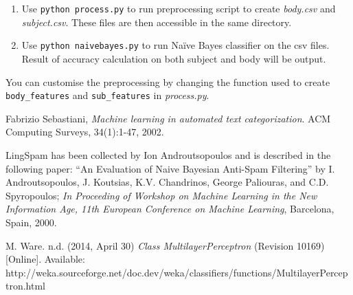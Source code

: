 \documentclass[10pt, a4paper]{article}
\begin{document}
\begin{enumerate}
\item Use \verb|python process.py| to run preprocessing script to create \textit{body.csv} and \textit{subject.csv}. These files are then accessible in the same directory. 
\item Use \verb|python naivebayes.py| to run Na\"ive Bayes classifier on the csv files. Result of accuracy calculation on both subject and body will be output.
\end{enumerate}

You can customise the preprocessing by changing the function used to create \verb|body_features| and \verb|sub_features| in \textit{process.py}.

\begin{thebibliography}{9}

  Fabrizio Sebastiani, \emph{Machine learning in automated text categorization}. ACM Computing Surveys, 34(1):1-47, 2002.

LingSpam has been collected by Ion Androutsopoulos and is described in the following paper: ``An Evaluation of Naive Bayesian Anti-Spam Filtering'' by I. Androutsopoulos, J. Koutsias, K.V. Chandrinos, George Paliouras, and C.D. Spyropoulos; \textit{In Proceeding of Workshop on Machine Learning in the New Information Age, 11th European Conference on Machine Learning}, Barcelona, Spain, 2000.

M. Ware. n.d. (2014, April 30) \emph{Class MultilayerPerceptron} (Revision 10169) [Online]. Available: http://weka.sourceforge.net/doc.dev/weka/classifiers/functions/MultilayerPerceptron.html

\end{thebibliography}
\end{document}
